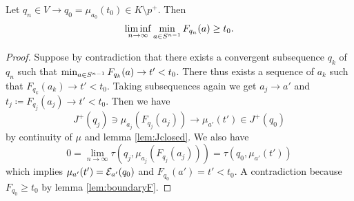 \begin{lemma}
    Let $q_n\in V\to q_0=\mu_{a_0}(t_0)\in K\setminus p^+$. Then 
    \[
        \liminf_{n\to \infty} \min_{a \in {S^{n-1}}} F_{q_n}(a) \ge t_0.
    \]
\end{lemma}
\begin{proof}
    Suppose by contradiction that there exists a convergent subsequence $q_k$ of $q_n$ such that $\min_{a \in {S^{n-1}}} F_{q_k}(a)\to t'<t_0$. There thus exists a sequence of $a_k$ such that $F_{q_k}(a_k)\to t'<t_0$. Taking subsequences again we get $a_j\to a'$ and $t_j\coloneqq F_{q_j}(a_j)\to t'<t_0$. Then we have 
    \[
        J^+(q_j)\ni \mu_{a_j}(F_{q_j}(a_j)) \to \mu_{a'}(t') \in J^+(q_0)
    \] by continuity of $\mu$ and lemma \ref{lem:Jclosed}. We also have 
    \[
        0 = \lim_{n\to \infty}\tau(q_j,\mu_{a_j}(F_{q_j}(a_j))) = \tau(q_0,\mu_{a'}(t'))
    \] which implies $\mu_{a'}(t')={\mathcal{E}}_{a'}(q_0)$ and $F_{q_0}(a')=t'<t_0$. A contradiction because $F_{q_0}\ge t_0$ by lemma \ref{lem:boundaryF}.
\end{proof}

